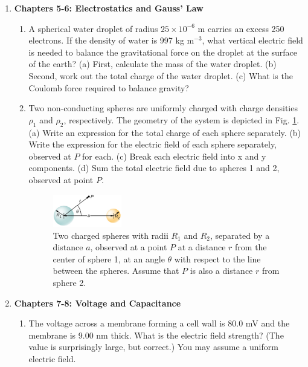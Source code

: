 \documentclass[10pt]{article}
\begin{document}
\begin{enumerate}
\item \textbf{Chapters 5-6: Electrostatics and Gauss' Law}
\begin{enumerate}
\item A spherical water droplet of radius $25 \times 10^{-6}$ m carries an excess 250 electrons. If the density of water is 997 kg m$^{-3}$, what vertical electric field is needed to balance the gravitational force on the droplet at the surface of the earth? (a) First, calculate the mass of the water droplet. (b) Second, work out the total charge of the water droplet.  (c) What is the Coulomb force required to balance gravity? \\ \vspace{4cm}
\item Two non-conducting spheres are uniformly charged with charge densities $\rho_1$ and $\rho_2$, respectively.  The geometry of the system is depicted in Fig. \ref{fig:spheres}.  (a) Write an expression for the total charge of each sphere separately.  (b)  Write the expression for the electric field of each sphere separately, observed at $P$ for each.  (c) Break each electric field into x and y components.  (d) Sum the total electric field due to spheres 1 and 2, observed at point $P$. \\ \vspace{4cm}
\begin{figure}
\centering
\includegraphics[width=0.3\textwidth]{spheres.png}
\caption{\label{fig:spheres} Two charged spheres with radii $R_1$ and $R_2$, separated by a distance $a$, observed at a point $P$ at a distance $r$ from the center of sphere 1, at an angle $\theta$ with respect to the line between the spheres.  Assume that $P$ is also a distance $r$ from sphere 2.}
\end{figure}
\end{enumerate}
\item \textbf{Chapters 7-8: Voltage and Capacitance}
\begin{enumerate}
\item The voltage across a membrane forming a cell wall is 80.0 mV and the membrane is 9.00 nm thick. What is the electric field strength? (The value is surprisingly large, but correct.) You may assume a uniform electric field. \\ \vspace{2cm}

\end{enumerate}
\end{enumerate}
\end{document}
